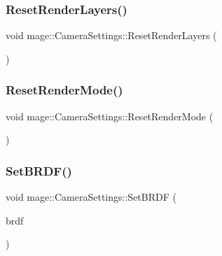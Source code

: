 \subsubsection{\texorpdfstring{Reset\+Render\+Layers()}{ResetRenderLayers()}}
{\footnotesize\ttfamily void mage\+::\+Camera\+Settings\+::\+Reset\+Render\+Layers (\begin{DoxyParamCaption}{ }\end{DoxyParamCaption})\hspace{0.3cm}{\ttfamily [noexcept]}}

\hypertarget{classmage_1_1_camera_settings_aa8facc0ddcd3e3d9f3c05c9f44c77b5d}{}\label{classmage_1_1_camera_settings_aa8facc0ddcd3e3d9f3c05c9f44c77b5d} 
\subsubsection{\texorpdfstring{Reset\+Render\+Mode()}{ResetRenderMode()}}
{\footnotesize\ttfamily void mage\+::\+Camera\+Settings\+::\+Reset\+Render\+Mode (\begin{DoxyParamCaption}{ }\end{DoxyParamCaption})\hspace{0.3cm}{\ttfamily [noexcept]}}

\hypertarget{classmage_1_1_camera_settings_a8fbc3d6013d5f711decaf6f7348f2e15}{}\label{classmage_1_1_camera_settings_a8fbc3d6013d5f711decaf6f7348f2e15} 
\subsubsection{\texorpdfstring{Set\+B\+R\+D\+F()}{SetBRDF()}}
{\footnotesize\ttfamily void mage\+::\+Camera\+Settings\+::\+Set\+B\+R\+DF (\begin{DoxyParamCaption}\item[{\hyperlink{namespacemage_ae7a7a03a7b34d7e2689689bb8295cd38}{B\+R\+D\+F\+Type}}]{brdf }\end{DoxyParamCaption})\hspace{0.3cm}{\ttfamily [noexcept]}}

\hypertarget{classmage_1_1_camera_settings_ab0d6720a08e88e018c2a2e6097933d98}{}\label{classmage_1_1_camera_settings_ab0d6720a08e88e018c2a2e6097933d98} 
